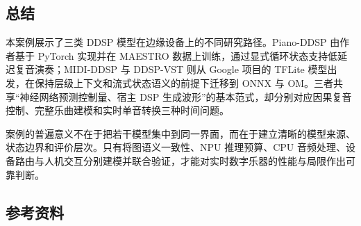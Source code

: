 \subsection{总结}\label{src-experiment-case3-summary}

本案例展示了三类 DDSP 模型在边缘设备上的不同研究路径。Piano-DDSP
由作者基于 PyTorch 实现并在 MAESTRO
数据上训练，通过显式循环状态支持低延迟复音演奏；MIDI-DDSP 与 DDSP-VST
则从 Google 项目的 TFLite
模型出发，在保持层级上下文和流式状态语义的前提下迁移到 ONNX 与
OM。三者共享``神经网络预测控制量、宿主 DSP
生成波形''的基本范式，却分别对应因果复音控制、完整乐曲建模和实时单音转换三种时间问题。

案例的普遍意义不在于把若干模型集中到同一界面，而在于建立清晰的模型来源、状态边界和评价层次。只有将图语义一致性、NPU
推理预算、CPU
音频处理、设备路由与人机交互分别建模并联合验证，才能对实时数字乐器的性能与局限作出可靠判断。

\subsection{参考资料}\label{src-experiment-case3-references}
